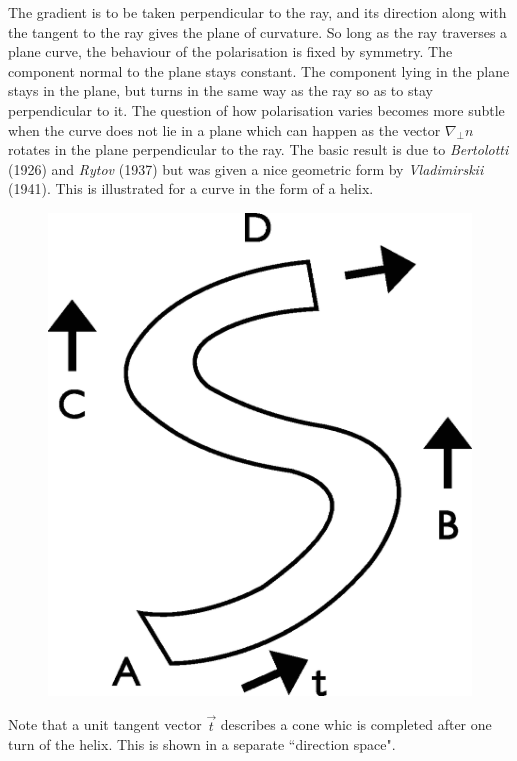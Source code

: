 The gradient is to be taken perpendicular to the ray, and its direction 
along with the  tangent to the ray gives
the plane of curvature. So long as the ray traverses a plane curve, the behaviour
of the polarisation is fixed by symmetry. The component normal to the plane
stays constant. The component lying in the plane stays in the plane, but
turns in the same way as the ray so as to stay perpendicular to it. The question
of how polarisation varies becomes more subtle when the curve does not lie in
a plane which can happen as the vector $\nabla_\perp n $ rotates in the plane perpendicular
to the ray. The basic result is due to \textit{Bertolotti} (1926) and \textit{Rytov} (1937) but was
given a nice geometric form by \textit{Vladimirskii} (1941). This is illustrated for a curve in
the form of a helix.
\bigskip

\begin{figure}[H]
\centering
\includegraphics[scale=0.14]{src/images/chap26/20.jpg}
\end{figure}
\bigskip

Note that a unit tangent vector $\overrightarrow{t}$ describes a cone whic is completed after
one turn of the helix. This is shown in a separate ``direction space".
\bigskip

